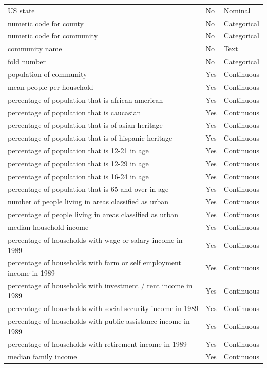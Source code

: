 \documentclass[
  11pt,
]{article}
\begin{document}
\begin{longtable}[t]{lll}
\endfoot
\bottomrule
\endlastfoot
US state & No & Nominal\\
numeric code for county & No & Categorical\\
numeric code for community & No & Categorical\\
community name & No & Text\\
fold number & No & Categorical\\
\addlinespace
population of community & Yes & Continuous\\
mean people per household & Yes & Continuous\\
percentage of population that is african american & Yes & Continuous\\
percentage of population that is caucasian & Yes & Continuous\\
percentage of population that is of asian heritage & Yes & Continuous\\
\addlinespace
percentage of population that is of hispanic heritage & Yes & Continuous\\
percentage of population that is 12-21 in age & Yes & Continuous\\
percentage of population that is 12-29 in age & Yes & Continuous\\
percentage of population that is 16-24 in age & Yes & Continuous\\
percentage of population that is 65 and over in age & Yes & Continuous\\
\addlinespace
number of people living in areas classified as urban & Yes & Continuous\\
percentage of people living in areas classified as urban & Yes & Continuous\\
median household income & Yes & Continuous\\
percentage of households with wage or salary income in 1989 & Yes & Continuous\\
percentage of households with farm or self employment income in 1989 & Yes & Continuous\\
\addlinespace
percentage of households with investment / rent income in 1989 & Yes & Continuous\\
percentage of households with social security income in 1989 & Yes & Continuous\\
percentage of households with public assistance income in 1989 & Yes & Continuous\\
percentage of households with retirement income in 1989 & Yes & Continuous\\
median family income & Yes & Continuous\\

\end{longtable}
\end{document}
